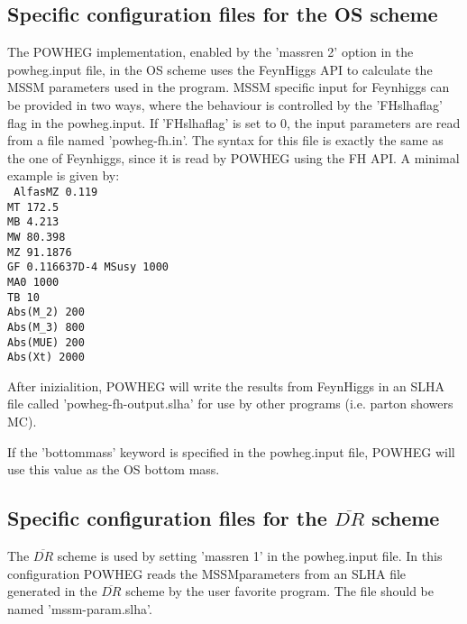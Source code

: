\documentclass[paper]{JHEP3}
\begin{document}
\subsection{Specific configuration files for the OS scheme}

The POWHEG implementation, enabled by the 'massren 2' option in the powheg.input file, in the OS scheme uses the FeynHiggs API to calculate the MSSM parameters used in the program.
MSSM specific input for Feynhiggs can be provided in two ways, where the behaviour is controlled by the 'FHslhaflag' flag in the powheg.input.
If 'FHslhaflag' is set to 0, the input parameters are read from a file named 'powheg-fh.in'. The syntax for this file is exactly the same
as the one of Feynhiggs, since it is read by POWHEG using the FH API.
A minimal example is given by:\\
{\tt
AlfasMZ      0.119\\
MT           172.5\\
MB           4.213\\
MW           80.398\\
MZ           91.1876\\
GF           0.116637D-4
MSusy        1000\\
MA0          1000\\
TB           10\\
Abs(M\_2)     200\\
Abs(M\_3)     800\\
Abs(MUE)     200\\
Abs(Xt)      2000\\
}

After inizialition, POWHEG will write the results from FeynHiggs in an SLHA file called 'powheg-fh-output.slha' for use by other programs (i.e. parton showers MC).

If the 'bottommass' keyword is specified in the powheg.input file, POWHEG will use this value as the OS bottom mass.

\subsection{Specific configuration files for the $\overline{DR}$ scheme}

The $\overline{DR}$ scheme is used by setting 'massren 1' in the powheg.input file.
In this configuration POWHEG reads the MSSMparameters from an SLHA file generated in the $\overline{DR}$ scheme by the user favorite program.
The file should be named 'mssm-param.slha'.
\end{document}

